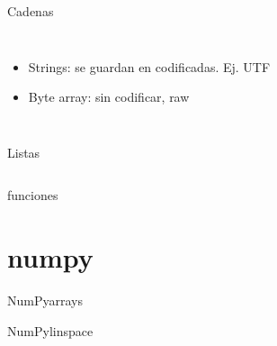  \begin{frame}{Cadenas}
    \begin{columns}
       \begin{itemize}
          \item{Strings: se guardan en codificadas. Ej. UTF}
          \item{Byte array: sin codificar, raw}
       \end{itemize}
       
    \end{columns}
    \vfill
 \end{frame}
 \begin{frame}{Listas}
    \begin{columns}
       
       
    \end{columns}
    \vfill
 \end{frame}
 \begin{frame}{funciones}
       
    \vfill
 \end{frame}
 \section{numpy}
 \begin{frame}{NumPy}{arrays}
       
    \vfill
 \end{frame}
 \begin{frame}{NumPy}{linspace}
    \begin{columns}
       
       
    \end{columns}
    \vfill
 \end{frame}

